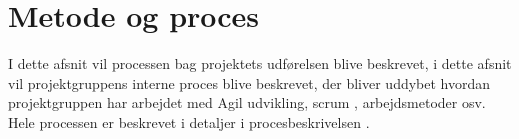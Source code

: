 \chapter{Metode og proces}
\label{cha:method-and-process}

I dette afsnit vil processen bag projektets udførelsen blive beskrevet, i dette afsnit vil projektgruppens interne proces blive beskrevet, der bliver uddybet hvordan projektgruppen har arbejdet med Agil udvikling, scrum \cite[Scrum]{converge-terms}, arbejdsmetoder osv. Hele processen er beskrevet i detaljer i procesbeskrivelsen \cite{proces}.

